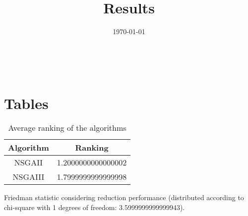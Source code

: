 \documentclass{article}
\title{Results}
\author{}
\date{\today}
\begin{document}
\oddsidemargin 0in \topmargin 0in\maketitle
\
\section{Tables}
\begin{table}[!htp]
\centering
\caption{Average ranking of the algorithms}
\begin{tabular}{c|c}
Algorithm&Ranking\\
\hline
NSGAII&1.2000000000000002\\
NSGAIII&1.7999999999999998\\
\end{tabular}
\end{table}


Friedman statistic considering reduction performance (distributed according to chi-square with 1 degrees of freedom: 3.5999999999999943).
\end{document}
